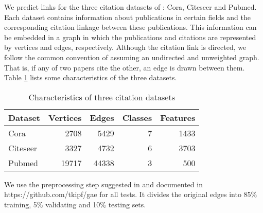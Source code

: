 \documentclass[conference]{IEEEtran}
\begin{document}
We predict links for the three citation datasets of \cite{sen2008collective}: Cora, Citeseer and Pubmed. Each dataset contains information about publications in  certain fields and the corresponding citation linkage between these publications. This information can be embedded in a graph in which the publications and citations are represented by vertices and edges, respectively. Although the citation link is directed, we follow the common convention of assuming an undirected and unweighted graph. That is, if any of two papers cite the other, an edge is drawn between them. 
Table \ref{tab:dataset} lists some characteristics of the three datasets. 

\begin{table}[t]
\caption{Characteristics of three citation datasets}\label{tab:dataset}
\centering
\begin{tabular}{lrrrr}
Dataset    &    Vertices    &    Edges    &    Classes    &    Features \\
\hline
Cora     &    2708    &    5429    &    7        &    1433    \\
Citeseer    &    3327    &    4732    &    6        &    3703    \\
Pubmed    &    19717    &    44338    &    3        &    500    \\
\end{tabular}
\end{table}

We use the preprocessing step suggested in \cite{kipf2016variational} and documented in  {https://github.com/tkipf/gae} for all tests. It divides the original edges into 85\%  training,  5\% validating and 10\% testing sets. 
\end{document}
